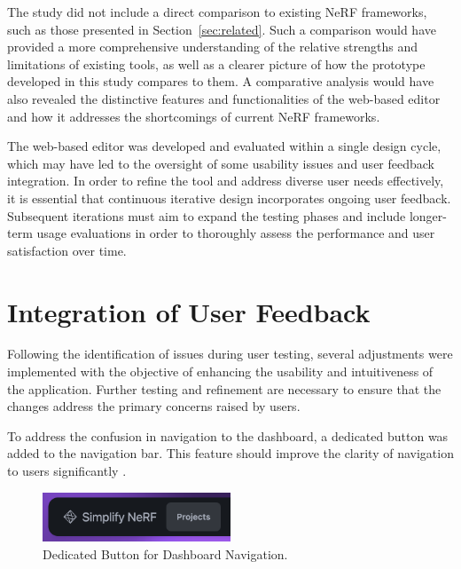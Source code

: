 The study did not include a direct comparison to existing NeRF frameworks, such as those presented in Section~\ref{sec:related}.
Such a comparison would have provided a more comprehensive understanding of the relative strengths and limitations of existing tools, as well as a clearer picture of how the prototype developed in this study compares to them.
A comparative analysis would have also revealed the distinctive features and functionalities of the web-based editor and how it addresses the shortcomings of current NeRF frameworks.

The web-based editor was developed and evaluated within a single design cycle, which may have led to the oversight of some usability issues and user feedback integration.
In order to refine the tool and address diverse user needs effectively, it is essential that continuous iterative design incorporates ongoing user feedback.
Subsequent iterations must aim to expand the testing phases and include longer-term usage evaluations in order to thoroughly assess the performance and user satisfaction over time.

\section{Integration of User Feedback}
\label{sec:discussion:user-feedback}

Following the identification of issues during user testing, several adjustments were implemented with the objective of enhancing the usability and intuitiveness of the application.
Further testing and refinement are necessary to ensure that the changes address the primary concerns raised by users.

To address the confusion in navigation to the dashboard, a dedicated button was added to the navigation bar.
This feature should improve the clarity of navigation to users significantly .

\begin{figure}[htb]
  \centering
	\includegraphics[width=0.5\textwidth]{figures/fix-1.png}
	\caption{Dedicated Button for Dashboard Navigation.}
  \label{fig:fix-1}
\end{figure}

